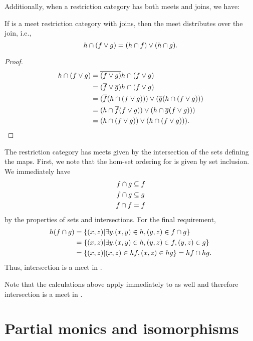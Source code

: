 Additionally, when a restriction category has both meets and joins, we have:
\begin{lemma}\label{lem:meet_distributes_over_join}
  If \R is a meet restriction category with joins, then the meet distributes over the join, i.e.,
  \[
    h\cap(f\vee g) = (h\cap f)\vee (h\cap g).
  \]
\end{lemma}
\begin{proof}
  \begin{align*}
    h\cap(f\vee g) &= \overline{(f\vee g)} h\cap (f\vee g)\\
    &= (\overline{f}\vee \overline{g}) h\cap (f\vee g)\\
    &= (\overline{f}(h\cap (f\vee g))) \vee (\overline{g}(h\cap (f\vee g)))\\
    &= (h\cap \overline{f}(f\vee g)) \vee (h\cap \overline{g}(f\vee g)))\\
    &= (h\cap (f\vee g)) \vee (h\cap (f\vee g))).
  \end{align*}
\end{proof}

\begin{example}\label{ex:pinj_has_meets}
The restriction category \pinj has meets given by the intersection of the sets defining the
maps. First, we note that the hom-set ordering for \pinj is given by set inclusion. We immediately have
\begin{align*}
  f\cap g &\subseteq f \\
  f\cap g &\subseteq g\\
  f\cap f & = f
\end{align*}
by the properties of sets and intersections. For the final requirement,
\begin{align*}
  h(f\cap g) &= \{(x,z) | \exists y. (x,y) \in h, (y,z) \in f\cap g\}\\
  &=   \{(x,z) | \exists y. (x,y)  \in h, (y,z) \in f, (y,z) \in g\}\\
  & = \{(x,z) | (x,z) \in h f, (x,z) \in h g\} = h f \cap h g.
\end{align*}
Thus, intersection is a meet in \pinj.

Note that the calculations above apply immediately to \Par as well and therefore intersection is a
meet in \Par.

\end{example}
\section{Partial monics and isomorphisms} %
\label{sub:restricted_monics_and_partial_isomorphisms}

